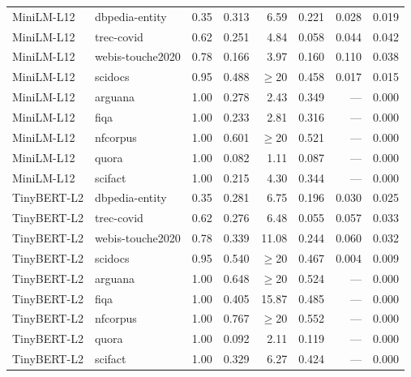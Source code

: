 \documentclass[sn-mathphys-num,pdflatex]{sn-jnl}
\begin{document}
\begin{appendices}
\begin{table}[h!]
\begin{tabular}{llrrrrrr}
\midrule
\rowcolor{cleangreen}
MiniLM-L12     & dbpedia-entity   & 0.35 & 0.313 & 6.59 & 0.221 & 0.028 & 0.019 \\
\rowcolor{cleangreen}
MiniLM-L12     & trec-covid       & 0.62 & 0.251 & 4.84 & 0.058 & 0.044 & 0.042 \\
\rowcolor{cleangreen}
MiniLM-L12     & webis-touche2020 & 0.78 & 0.166 & 3.97 & 0.160 & 0.110 & 0.038 \\
\rowcolor{cleangreen}
MiniLM-L12     & scidocs          & 0.95 & 0.488 & $\geq$20 & 0.458 & 0.017 & 0.015 \\
\rowcolor{singleclasspink}
MiniLM-L12     & arguana          & 1.00 & 0.278 & 2.43 & 0.349 & --- & 0.000 \\
\rowcolor{singleclasspink}
MiniLM-L12     & fiqa             & 1.00 & 0.233 & 2.81 & 0.316 & --- & 0.000 \\
\rowcolor{singleclasspink}
MiniLM-L12     & nfcorpus         & 1.00 & 0.601 & $\geq$20 & 0.521 & --- & 0.000 \\
\rowcolor{singleclasspink}
MiniLM-L12     & quora            & 1.00 & 0.082 & 1.11 & 0.087 & --- & 0.000 \\
\rowcolor{singleclasspink}
MiniLM-L12     & scifact          & 1.00 & 0.215 & 4.30 & 0.344 & --- & 0.000 \\
\midrule
\rowcolor{cleangreen}
TinyBERT-L2    & dbpedia-entity   & 0.35 & 0.281 & 6.75 & 0.196 & 0.030 & 0.025 \\
\rowcolor{cleangreen}
TinyBERT-L2    & trec-covid       & 0.62 & 0.276 & 6.48 & 0.055 & 0.057 & 0.033 \\
\rowcolor{cleangreen}
TinyBERT-L2    & webis-touche2020 & 0.78 & 0.339 & 11.08 & 0.244 & 0.060 & 0.032 \\
\rowcolor{cleangreen}
TinyBERT-L2    & scidocs          & 0.95 & 0.540 & $\geq$20 & 0.467 & 0.004 & 0.009 \\
\rowcolor{singleclasspink}
TinyBERT-L2    & arguana          & 1.00 & 0.648 & $\geq$20 & 0.524 & --- & 0.000 \\
\rowcolor{singleclasspink}
TinyBERT-L2    & fiqa             & 1.00 & 0.405 & 15.87 & 0.485 & --- & 0.000 \\
\rowcolor{singleclasspink}
TinyBERT-L2    & nfcorpus         & 1.00 & 0.767 & $\geq$20 & 0.552 & --- & 0.000 \\
\rowcolor{singleclasspink}
TinyBERT-L2    & quora            & 1.00 & 0.092 & 2.11 & 0.119 & --- & 0.000 \\
\rowcolor{singleclasspink}
TinyBERT-L2    & scifact          & 1.00 & 0.329 & 6.27 & 0.424 & --- & 0.000 \\

\end{tabular}
\end{table}
\end{appendices}
\end{document}
